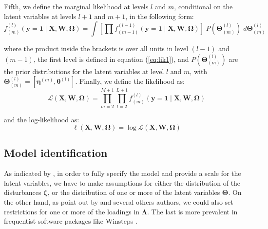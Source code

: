 \noindent Fifth, we define the marginal likelihood at levels $l$ and $m$, conditional on the latent variables at levels $l+1$ and $m+1$, in the following form:
%
\begin{equation} \label{eq:lik2}
	f^{(l)}_{(m)} \left( \mathbf{y}=\mathbf{1} \; | \; \mathbf{X}, \mathbf{W}, \pmb{\Omega} \right) = \int \left[ \prod f^{(l-1)}_{(m-1)} \left( \mathbf{y}=\mathbf{1} \; | \; \mathbf{X}, \mathbf{W}, \pmb{\Omega} \right) \right] \; P( \pmb{\Theta}^{(l)}_{(m)} ) \; d\pmb{\Theta}^{(l)}_{(m)}
\end{equation}

\noindent where the product inside the brackets is over all units in level $(l-1)$ and $(m-1)$, the first level is defined in equation (\ref{eq:lik1}), and $P( \pmb{\Theta}^{(l)}_{(m)} )$ are the prior distributions for the latent variables at level $l$ and $m$, with $\pmb{\Theta}^{(l)}_{(m)} = [\pmb{\eta}^{(m)}, \pmb{\theta}^{(l)}]$. Finally, we define the likelihood as:
%
\begin{equation} \label{eq:lik3}
	\mathcal{L}(\mathbf{X}, \mathbf{W}, \pmb{\Omega}) = \prod_{m=2}^{M+1} \prod_{l=2}^{L+1} f^{(l)}_{(m)} \left( \mathbf{y}=\mathbf{1} \; | \; \mathbf{X}, \mathbf{W}, \pmb{\Omega} \right)
\end{equation}

\noindent and the log-likelihood as:
%
\begin{equation} \label{eq:loglik}
	\ell(\mathbf{X}, \mathbf{W}, \pmb{\Omega}) = \log \mathcal{L}(\mathbf{X}, \mathbf{W}, \pmb{\Omega})
\end{equation}


\subsection{Model identification} \label{sect:identification}

As indicated by \citet{Rabe_et_al_2004a}, in order to fully specify the model and provide a scale for the latent variables, we have to make assumptions for either the distribution of the disturbances $\pmb{\zeta}$, or the distribution of one or more of the latent variables $\pmb{\Theta}$. On the other hand, as point out by \citet{Fujimoto_2018b} and several others authors, we could also set restrictions for one or more of the loadings in $\pmb{\Lambda}$. The last is more prevalent in frequentist software packages like Winsteps \cite{Winsteps2021}.

